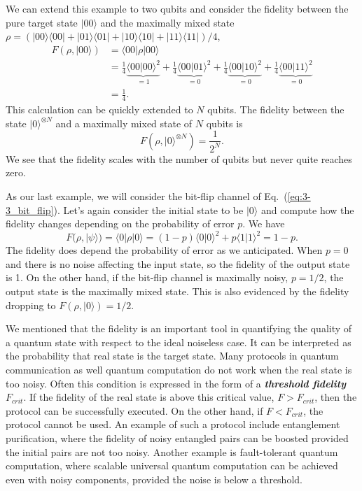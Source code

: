 We can extend this example to two qubits and consider the fidelity between the pure target state $|00\rangle$ and the maximally mixed state $\rho = (|00\rangle\langle00|+|01\rangle\langle01|+|10\rangle\langle10|+|11\rangle\langle11|)/4$,
\begin{align}
    F(\rho, |00\rangle) & = \langle00| \rho | 00\rangle \nonumber\\
    & = \frac{1}{4} \underbrace{\langle00|00\rangle^2}_{=1} + \frac{1}{4} \underbrace{\langle00|01\rangle^2}_{=0} + \frac{1}{4} \underbrace{\langle00|10\rangle^2}_{=0} + \frac{1}{4} \underbrace{\langle00|11\rangle^2}_{=0} \nonumber\\
    & = \frac{1}{4}.
\end{align}
This calculation can be quickly extended to $N$ qubits.
The fidelity between the state $|0\rangle^{\otimes N}$ and a maximally mixed state of $N$ qubits is
\begin{equation}
    F(\rho,|0\rangle^{\otimes N}) = \frac{1}{2^N}.
\end{equation}
We see that the fidelity scales with the number of qubits but never quite reaches zero.

As our last example, we will consider the bit-flip channel of Eq.~(\ref{eq:3-3_bit_flip}).
Let's again consider the initial state to be $|0\rangle$ and compute how the fidelity changes depending on the probability of error $p$.
We have
\begin{equation}
    F(\rho,|\psi\rangle) = \langle0| \rho | 0\rangle = (1-p) \langle0|0\rangle^2 + p \langle1|1\rangle^2 = 1 - p.
\end{equation}
The fidelity does depend the probability of error as we anticipated.
When $p=0$ and there is no noise affecting the input state, so the fidelity of the output state is 1.
On the other hand, if the bit-flip channel is maximally noisy, $p=1/2$, the output state is the maximally mixed state.
This is also evidenced by the fidelity dropping to $F(\rho,|0\rangle)=1/2$.

We mentioned that the fidelity is an important tool in quantifying the quality of a quantum state with respect to the ideal noiseless case.
It can be interpreted as the probability that real state is the target state.
Many protocols in quantum communication as well quantum computation do not work when the real state is too noisy.
Often this condition is expressed in the form of a \textit{\textbf{threshold fidelity}} $F_{crit}$.
If the fidelity of the real state is above this critical value, $F > F_{crit}$, then the protocol can be successfully executed.
On the other hand, if $F < F_{crit}$, the protocol cannot be used.
An example of such a protocol include entanglement purification, where the fidelity of noisy entangled pairs can be boosted provided the initial pairs are not too noisy.
Another example is fault-tolerant quantum computation, where scalable universal quantum computation can be achieved even with noisy components, provided the noise is below a threshold.


